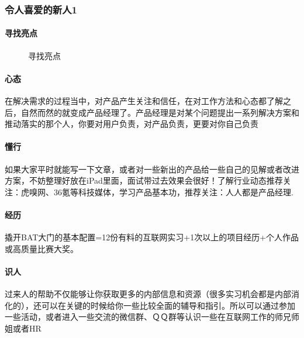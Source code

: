 \documentclass[letterpaper,11pt,english]{sphinxmanual}
\begin{document}
\subsubsection{令人喜爱的新人1\sphinxfootnotemark[788]}
\label{\detokenize{chapter_interview/new_like:id1}}\label{\detokenize{chapter_interview/new_like::doc}}%
\begin{footnotetext}[788]\sphinxAtStartFootnote
{}
%
\end{footnotetext}\ignorespaces 

\paragraph{寻找亮点}
\label{\detokenize{chapter_interview/new_like:id2}}
\begin{figure}[H]
\centering
\capstart

\noindent{}
\caption{寻找亮点}\label{\detokenize{chapter_interview/new_like:id22}}\end{figure}


\paragraph{心态}
\label{\detokenize{chapter_interview/new_like:id3}}
在解决需求的过程当中，对产品产生关注和信任，在对工作方法和心态都了解之后，自然而然的就变成产品经理了。产品经理是对某个问题提出一系列解决方案和推动落实的那个人，你要对用户负责，对产品负责，更要对你自己负责


\paragraph{懂行}
\label{\detokenize{chapter_interview/new_like:id4}}
如果大家平时就能写一下文章，或者对一些新出的产品给一些自己的见解或者改进方案，不妨整理好放在iPad里面，面试带过去效果会很好！了解行业动态推荐关注：虎嗅网、36氪等科技媒体，学习产品基本功，推荐关注：人人都是产品经理.


\paragraph{经历}
\label{\detokenize{chapter_interview/new_like:id5}}
撬开BAT大门的基本配置=1\sphinxhyphen{}2份有料的互联网实习+1次以上的项目经历+个人作品或高质量比赛大奖。


\paragraph{识人}
\label{\detokenize{chapter_interview/new_like:id6}}
过来人的帮助不仅能够让你获取更多的内部信息和资源（很多实习机会都是内部消化的），还可以在关键的时候给你一些比较全面的辅导和指引。所以可以通过参加一些活动，或者进入一些交流的微信群、ＱＱ群等认识一些在互联网工作的师兄师姐或者HR
\end{document}
